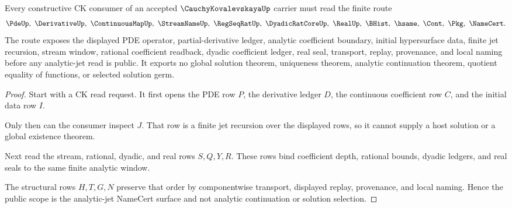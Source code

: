 \begin{theorem}
\label{thm:cauchy-kovalevskaya-analytic-jet-scope}
Every constructive CK consumer of an accepted $\CauchyKovalevskayaUp$ carrier must read the finite route
$$
\PdeUp,\ \DerivativeUp,\ \ContinuousMapUp,\ \StreamNameUp,\ \RegSeqRatUp,\ \DyadicRatCoreUp,\ \RealUp,\ \BHist,\ \hsame,\ \Cont,\ \Pkg,\ \NameCert .
$$
The route exposes the displayed PDE operator, partial-derivative ledger, analytic coefficient boundary, initial hypersurface data, finite jet recursion, stream window, rational coefficient readback, dyadic coefficient ledger, real seal, transport, replay, provenance, and local naming before any analytic-jet read is public. It exports no global solution theorem, uniqueness theorem, analytic continuation theorem, quotient equality of functions, or selected solution germ.
\end{theorem}
\begin{proof}
Start with a CK read request. It first opens the PDE row $P$, the derivative ledger $D$, the continuous coefficient row $C$, and the initial data row $I$.

Only then can the consumer inspect $J$. That row is a finite jet recursion over the displayed rows, so it cannot supply a host solution or a global existence theorem.

Next read the stream, rational, dyadic, and real rows $S,Q,Y,R$. These rows bind coefficient depth, rational bounds, dyadic ledgers, and real seals to the same finite analytic window.

The structural rows $H,T,G,N$ preserve that order by componentwise transport, displayed replay, provenance, and local naming. Hence the public scope is the analytic-jet NameCert surface and not analytic continuation or solution selection.
\end{proof}

